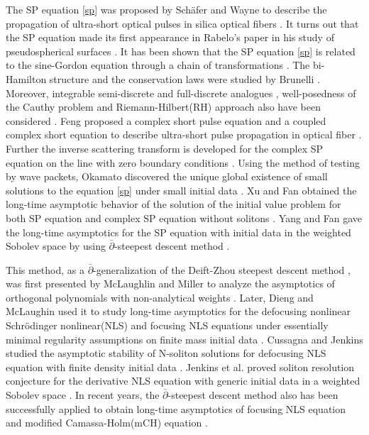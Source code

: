 \documentclass[11pt]{article}
\numberwithin{equation}{section}
\begin{document}
The SP equation \eqref{sp}   was proposed by Sch\"afer and Wayne to describe the propagation of ultra-short optical pulses in silica optical fibers \cite{sch-2004}. It turns out that the SP equation made its first appearance in Rabelo's paper in his study  of pseudospherical surfaces \cite{rabelo-1989}. It has been shown that the SP equation \eqref{sp} is related to the sine-Gordon equation through a chain of transformations \cite{sakovich-2005}. The bi-Hamilton structure and the conservation laws were studied by Brunelli \cite{brunelli-2005,brunelli-2006}. Moreover, integrable semi-discrete and full-discrete analogues \cite{feng-2010}, well-posedness of the Cauthy problem \cite{coclite-2015,pelinovsky-2010} and Riemann-Hilbert(RH) approach also have been considered \cite{boutet-2017}.    Feng    proposed  a complex short pulse equation and a coupled complex short equation to describe ultra-short pulse propagation in optical fiber \cite{Feng2}.  Further the inverse scattering transform  is developed  for the complex SP  equation  on the line with zero boundary conditions \cite{Feng3}. Using the method of testing by wave packets, Okamato discovered the unique global existence of small solutions to the equation \eqref{sp} under small initial data \cite{okamoto-2017}. Xu and Fan obtained  the  long-time asymptotic behavior of the solution of the initial value problem  for  both
 SP  equation and complex SP equation without solitons \cite{XF1,XF2}.    Yang and Fan gave the long-time asymptotics for the SP equation with  initial data in the weighted Sobolev space by using $\bar\partial$-steepest descent method  \cite{YF1}.

 This method,   as  a $\bar\partial$-generalization of    the Deift-Zhou steepest descent method \cite{zhou-1993},  was first presented by McLaughlin and Miller to analyze the asymptotics of orthogonal polynomials with non-analytical weights  \cite{mclaughlin-2006,mclaughlin-2008}. Later, Dieng and McLaughin used it to study long-time asymptotics for the defocusing nonlinear Schr\"odinger nonlinear(NLS) and focusing NLS equations under essentially minimal regularity assumptions on finite mass initial data
\cite{dieng-2019}. Cussagna and Jenkins studied the asymptotic stability  of N-soliton solutions for defocusing NLS equation with finite density initial data \cite{cuccagna-2016}. Jenkins et al. proved  soliton resolution conjecture
for the derivative   NLS equation with generic initial data in a weighted Sobolev space \cite{jenkins-2018}. In recent years, the  $\bar\partial$-steepest descent method also has been    successfully applied to obtain long-time asymptotics of  focusing NLS equation and  modified Camassa-Holm(mCH)  equation  \cite{borghese-2018-2,YF2}.
\end{document}
